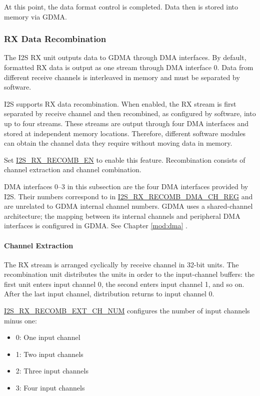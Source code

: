 \documentclass[main\_\_EN.tex]{subfiles}
\begin{document}
At this point, the data format control is completed. Data then is stored into memory via GDMA.

\subsubsection{RX Data Recombination}\label{sec:i2s-rx-recomb}

The I2S RX unit outputs data to GDMA through DMA interfaces. By default, formatted RX data is output as one stream through DMA interface 0. Data from different receive channels is interleaved in memory and must be separated by software.

I2S supports RX data recombination. When enabled, the RX stream is first separated by receive channel and then recombined, as configured by software, into up to four streams. These streams are output through four DMA interfaces and stored at independent memory locations. Therefore, different software modules can obtain the channel data they require without moving data in memory.

Set \hyperref[fielddesc:I2SRXRECOMBEN]{I2S\_RX\_RECOMB\_EN} to enable this feature. Recombination consists of channel extraction and channel combination.

\begin{tiplisting}
DMA interfaces 0--3 in this subsection are the four DMA interfaces provided by I2S. Their numbers correspond to  in \hyperref[regdesc:I2SRXRECOMBDMACH0REG]{I2S\_RX\_RECOMB\_DMA\_CH\_REG} and are unrelated to GDMA internal channel numbers. GDMA uses a shared-channel architecture; the mapping between its internal channels and peripheral DMA interfaces is configured in GDMA. See Chapter \ref{mod:dma} \textit{}.
\end{tiplisting}

\paragraph{Channel Extraction}

The RX stream is arranged cyclically by receive channel in 32-bit units. The recombination unit distributes the units in order to the input-channel buffers: the first unit enters input channel 0, the second enters input channel 1, and so on. After the last input channel, distribution returns to input channel 0.

\hyperref[fielddesc:I2SRXRECOMBEXTCHNUM]{I2S\_RX\_RECOMB\_EXT\_CH\_NUM} configures the number of input channels minus one:
\begin{itemize}
    \item 0: One input channel
    \item 1: Two input channels
    \item 2: Three input channels
    \item 3: Four input channels
\end{itemize}
\end{document}
